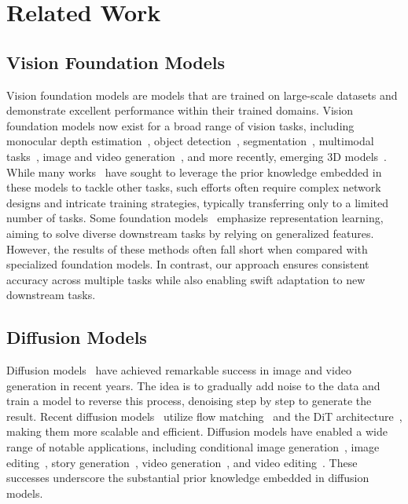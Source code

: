 \section{Related Work}
\subsection{Vision Foundation Models}
Vision foundation models are models that are trained on large-scale datasets and demonstrate excellent performance within their trained domains.
Vision foundation models now exist for a broad range of vision tasks, including monocular depth estimation~\cite{yang2024depth, yang2024depth2, yang2024depthvideo, bochkovskii2024depth}, object detection~\cite{carion2020end}, segmentation~\cite{kirillov2023segment, ravi2024sam}, multimodal tasks~\cite{radford2021learning, liu2024visual}, image and video generation~\cite{rombach2022high, esser2024scaling, blattmann2023stable}, and more recently, emerging 3D models~\cite{wang2024dust3r, ma2024you}. While many works~\cite{wang2024task,khanna2024explora,li2024matching,rajivc2023segment,zhong2024convolution, zhu2024unleashing} have sought to leverage the prior knowledge embedded in these models to tackle other tasks, such efforts often require complex network designs and intricate training strategies, typically transferring only to a limited number of tasks.
Some foundation models~\cite{ren2024dino, he2022masked, oquab2023dinov2, caron2021emerging} emphasize representation learning, aiming to solve diverse downstream tasks by relying on generalized features. However, the results of these methods often fall short when compared with specialized foundation models. In contrast, our approach ensures consistent accuracy across multiple tasks while also enabling swift adaptation to new downstream tasks.


\subsection{Diffusion Models}
Diffusion models~\cite{esser2024scaling, rombach2022high, blattmann2023stable} have achieved remarkable success in image and video generation in recent years. The idea is to gradually add noise to the data and train a model to reverse this process, denoising step by step to generate the result. Recent diffusion models~\cite{esser2024scaling} utilize flow matching~\cite{lipman2022flow, albergo2022building, liu2022flow} and the DiT architecture~\cite{peebles2023scalable}, making them more scalable and efficient. Diffusion models have enabled a wide range of notable applications, including conditional image generation~\cite{zhang2023adding, li2024photomaker, ye2023ip, mou2024t2i, qin2023unicontrol}, image editing~\cite{brooks2023instructpix2pix, kawar2023imagic, yang2023paint}, story generation~\cite{wang2024autostory, zhou2024storydiffusion}, video generation~\cite{ho2022video, guo2023animatediff, zhao2024moviedreamer, yang2024cogvideox, blattmann2023stable, kong2024hunyuanvideo, wang2024framer}, and video editing~\cite{ceylan2023pix2video, liu2024video, chai2023stablevideo}. These successes underscore the substantial prior knowledge embedded in diffusion models.

